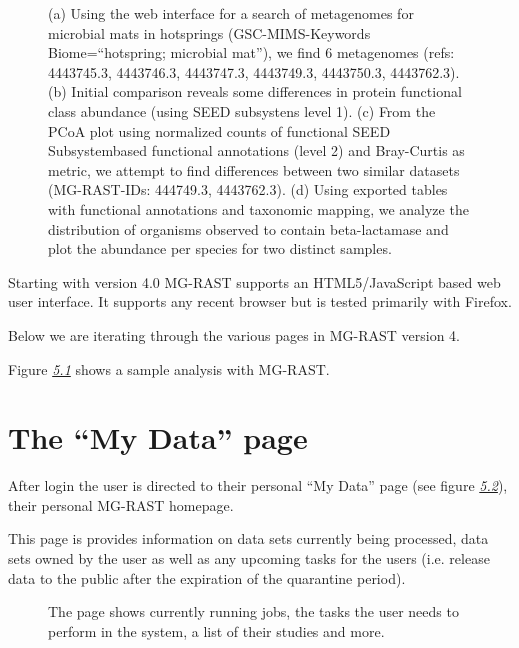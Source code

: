 \documentclass[letterpaper,10pt,english]{sphinxmanual}
\begin{document}
\begin{figure}[htbp]
\centering
\capstart

\noindent{}
\caption{(a) Using the web interface for a search of metagenomes for microbial
mats in hotsprings (GSC-MIMS-Keywords Biome=“hotspring; microbial
mat”), we find 6 metagenomes (refs: 4443745.3, 4443746.3, 4443747.3,
4443749.3, 4443750.3, 4443762.3). (b) Initial comparison reveals some
differences in protein functional class abundance (using SEED
subsystens level 1). (c) From the PCoA plot using normalized counts
of functional SEED Subsystem\textendash{}based functional annotations (level 2)
and Bray-Curtis as metric, we attempt to find differences between two
similar datasets (MG-RAST-IDs: 444749.3, 4443762.3). (d) Using
exported tables with functional annotations and taxonomic mapping, we
analyze the distribution of organisms observed to contain
beta-lactamase and plot the abundance per species for two distinct
samples.}\label{\detokenize{user_manual:fig-quad-chart-analysis-example}}\end{figure}

\begin{DUlineblock}{0em}
\item[] Starting with version 4.0 MG-RAST supports an HTML5/JavaScript based
web user interface. It supports any recent browser but is tested
primarily with Firefox.
\item[] Below we are iterating through the various pages in MG-RAST version 4.
\end{DUlineblock}

Figure {\hyperref[\detokenize{user_manual:fig:quad-chart-analysis-example}]{\emph{5.1}}} shows a sample
analysis with MG-RAST.


\section{The “My Data” page}
\label{\detokenize{user_manual:the-my-data-page}}
After login the user is directed to their personal “My Data” page (see
figure {\hyperref[\detokenize{user_manual:fig:v4-mydata}]{\emph{5.2}}}), their personal MG-RAST homepage.

This page is provides information on data sets currently being
processed, data sets owned by the user as well as any upcoming tasks for
the users (i.e. release data to the public after the expiration of the
quarantine period).

\begin{figure}[htbp]
\centering
\capstart

\noindent{}
\caption{The page shows currently running jobs, the tasks the user needs to
perform in the system, a list of their studies and more.}\label{\detokenize{user_manual:fig-v4-mydata}}\end{figure}
\end{document}

